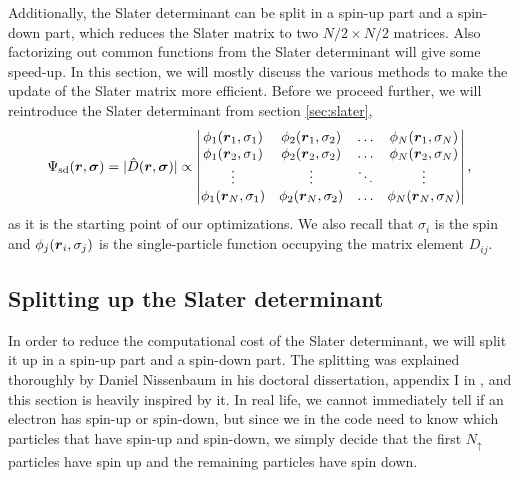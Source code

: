 Additionally, the Slater determinant can be split in a spin-up part and a spin-down part, which reduces the Slater matrix to two $N/2\times N/2$ matrices. Also factorizing out common functions from the Slater determinant will give some speed-up. In this section, we will mostly discuss the various methods to make the update of the Slater matrix more efficient. Before we proceed further, we will reintroduce the Slater determinant from section \ref{sec:slater},
\begin{equation}
\Psi_{\text{sd}}(\boldsymbol{{r}},\boldsymbol{{\sigma}})=|\hat{D}(\boldsymbol{{r}},\boldsymbol{{\sigma}})|\propto
\begin{vmatrix}
\phi_1(\boldsymbol{r}_1,\sigma_1) & \phi_2(\boldsymbol{r}_1,\sigma_2) & \hdots & \phi_N(\boldsymbol{r}_1,\sigma_N)\\
\phi_1(\boldsymbol{r}_2,\sigma_1) & \phi_2(\boldsymbol{r}_2,\sigma_2) & \hdots & \phi_N(\boldsymbol{r}_2,\sigma_N)\\
\vdots & \vdots & \ddots & \vdots \\
\phi_1(\boldsymbol{r}_N,\sigma_1) & \phi_2(\boldsymbol{r}_N,\sigma_2) & \hdots & \phi_N(\boldsymbol{r}_N,\sigma_N)
\end{vmatrix},
\label{eq:generalslater}
\end{equation}
as it is the starting point of our optimizations. We also recall that $\sigma_i$ is the spin and $\phi_j(\boldsymbol{{r}}_i,\sigma_j)$ is the single-particle function occupying the matrix element $D_{ij}$.

\subsection{Splitting up the Slater determinant} \label{sec:splittingofslater}
In order to reduce the computational cost of the Slater determinant, we will split it up in a spin-up part and a spin-down part. The splitting was explained thoroughly by Daniel Nissenbaum in his doctoral dissertation, appendix I in \cite{nissenbaum_stochastic_2008}, and this section is heavily inspired by it. In real life, we cannot immediately tell if an electron has spin-up or spin-down, but since we in the code need to know which particles that have spin-up and spin-down, we simply decide that the first $N_{\uparrow}$ particles have spin up and the remaining particles have spin down. 

